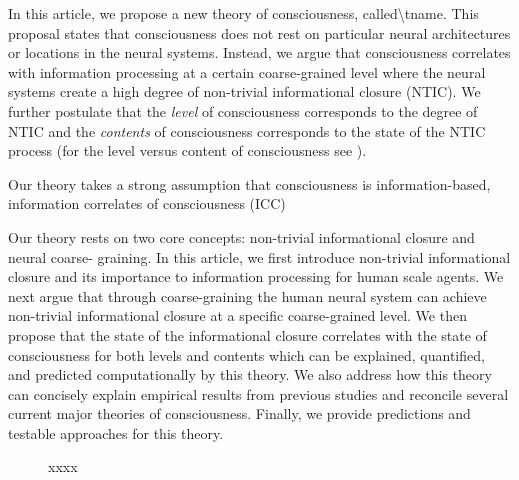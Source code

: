 \documentclass[utf8]{article}
\begin{document}
		In this article, we propose a new theory of consciousness, called\ac{\tname}. This proposal states that consciousness does not rest on particular neural architectures or locations in the neural systems. Instead, we argue that consciousness correlates with information processing at a certain coarse-grained level where the neural systems create a high degree of non-trivial informational closure (NTIC). We further postulate that the \textit{level} of consciousness corresponds to the degree of NTIC and the \textit{contents} of consciousness corresponds to the state of the NTIC process (for the level versus content of consciousness see \cite{laureys2005neural, overgaard2010neural}).
		
		
		Our theory takes a strong assumption that consciousness is information-based, information correlates of consciousness (ICC)


		Our theory rests on two core concepts: non-trivial informational closure and neural coarse- graining. In this article, we first introduce non-trivial informational closure and its importance to information processing for human scale agents. We next argue that through coarse-graining the human neural system can achieve non-trivial informational closure at a specific coarse-grained level. We then propose that the state of the informational closure correlates with the state of consciousness for both levels and contents which can be explained, quantified, and predicted computationally by this theory. We also address how this theory can concisely explain empirical results from previous studies and reconcile several current major theories of consciousness. Finally, we provide predictions and testable approaches for this theory.


		\begin{figure}[H]
			\cite{pennartz2017consciousness}
			\caption{xxxx}
	   	\end{figure}
\end{document}
